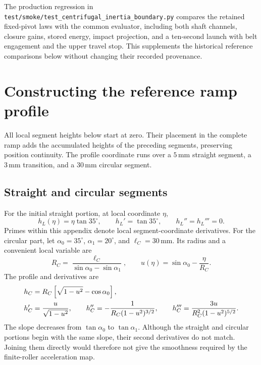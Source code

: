 \documentclass[11pt,letterpaper]{article}
\numberwithin{equation}{section}
\begin{document}
The production regression in
\texttt{test/smoke/test\_centrifugal\_inertia\_boundary.py} compares the retained
fixed-pivot laws with the common evaluator, including both shaft channels,
closure gains, stored energy, impact projection, and a ten-second launch with
belt engagement and the upper travel stop. This supplements the historical
reference comparisons below without changing their recorded provenance.

\clearpage
\appendix
\section{Constructing the reference ramp profile}
\label{app:profile}

All local segment heights below start at zero. Their placement in the complete ramp adds the accumulated heights of the preceding segments, preserving position continuity. The profile coordinate runs over a $5\,\mathrm{mm}$ straight segment, a $3\,\mathrm{mm}$ transition, and a $30\,\mathrm{mm}$ circular segment.

\subsection{Straight and circular segments}

For the initial straight portion, at local coordinate $\eta$,
\begin{equation}
  h_L(\eta)=\eta\tan35^\circ,\qquad
  h_L'=\tan35^\circ,\qquad h_L''=h_L'''=0.
\end{equation}
Primes within this appendix denote local segment-coordinate derivatives. For the circular part, let $\alpha_0=35^\circ$, $\alpha_1=20^\circ$, and $\ell_C=30\,\mathrm{mm}$. Its radius and a convenient local variable are
\begin{equation}
  R_C=\frac{\ell_C}{\sin\alpha_0-\sin\alpha_1},
  \qquad u(\eta)=\sin\alpha_0-\frac{\eta}{R_C}.
\end{equation}
The profile and derivatives are
\begin{align}
  h_C&=R_C\left[\sqrt{1-u^2}-\cos\alpha_0\right],\notag\\
  h_C'&=\frac{u}{\sqrt{1-u^2}},\qquad
  h_C''=-\frac{1}{R_C(1-u^2)^{3/2}},\qquad
  h_C'''=\frac{3u}{R_C^2(1-u^2)^{5/2}}.
  \label{eq:circular-profile}
\end{align}
The slope decreases from $\tan\alpha_0$ to $\tan\alpha_1$. Although the straight and circular portions begin with the same slope, their second derivatives do not match. Joining them directly would therefore not give the smoothness required by the finite-roller acceleration map.
\end{document}
